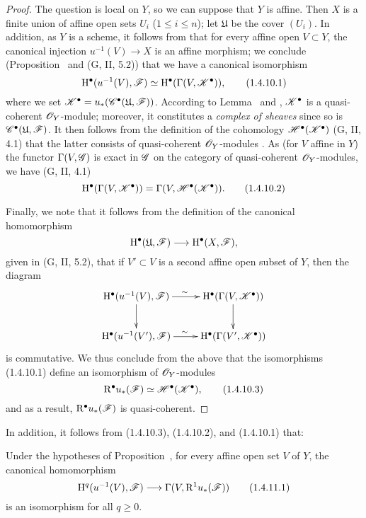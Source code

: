 \begin{proof}
\label{proof-III.1.4.10}
The question is local on $Y$, so we can suppose that $Y$ is affine.
Then $X$ is a finite union of affine open sets $U_i$ ($1\leq i\leq n$); let $\mathfrak{U}$ be the cover $(U_i)$.
In addition, as $Y$ is a scheme, it follows from  that for every affine open $V\subset Y$, the canonical injection $u^{-1}(V)\to X$ is an affine morphism; we conclude (Proposition~ and (G, II, 5.2)) that we have a canonical isomorphism
\[
  \mathrm{H}^\bullet(u^{-1}(V),\mathscr{F})\simeq\mathrm{H}^\bullet(\Gamma(V,\mathscr{K}^\bullet)),
  \tag{1.4.10.1}
\]
where we set $\mathscr{K}^\bullet=u_*(\mathscr{C}^\bullet(\mathfrak{U},\mathscr{F}))$.
According to Lemma~ and , $\mathscr{K}^\bullet$ is a quasi-coherent $\mathscr{O}_Y$-module; moreover, it constitutes a \emph{complex of sheaves} since so is $\mathscr{C}^\bullet(\mathfrak{U},\mathscr{F})$.
It then follows from the definition of the cohomology $\mathscr{H}^\bullet(\mathscr{K}^\bullet)$ (G, II, 4.1) that the latter consists of quasi-coherent $\mathscr{O}_Y$-modules .
As (for $V$ affine in $Y$) the functor $\Gamma(V,\mathscr{G})$ is exact in $\mathscr{G}$ on the category of quasi-coherent $\mathscr{O}_Y$-modules, we have (G, II, 4.1)
\[
  \mathrm{H}^\bullet(\Gamma(V,\mathscr{K}^\bullet))=\Gamma(V,\mathscr{H}^\bullet(\mathscr{K}^\bullet)).
  \tag{1.4.10.2}
\]

Finally, we note that it follows from the definition of the canonical homomorphism
\[
  \HH^\bullet(\mathfrak{U},\sh{F})\to\HH^\bullet(X,\sh{F}),
\]
given in (G, II, 5.2), that if $V'\subset V$ is a second affine open subset of $Y$, then the
diagram
\[
  \xymatrix{
    \HH^\bullet(u^{-1}(V),\sh{F})\ar[r]^\sim\ar[d] &
    \HH^\bullet(\Gamma(V,\sh{K}^\bullet))\ar[d]\\
    \HH^\bullet(u^{-1}(V'),\sh{F})\ar[r]^\sim &
    \HH^\bullet(\Gamma(V',\sh{K}^\bullet))
  }
\]
is commutative.
We thus conclude from the above that the isomorphisms (1.4.10.1) define an isomorphism of $\mathscr{O}_Y$-modules
\[
  \mathrm{R}^\bullet u_*(\mathscr{F})\simeq\mathscr{H}^\bullet(\mathscr{K}^\bullet),
  \tag{1.4.10.3}
\]
and as a result, $\mathrm{R}^\bullet u_*(\mathscr{F})$ is quasi-coherent.
\end{proof}

In addition, it follows from (1.4.10.3), (1.4.10.2), and (1.4.10.1) that:
\begin{corollary}[1.4.11]
\label{III.1.4.11}
Under the hypotheses of Proposition~, for every affine open set $V$ of $Y$, the canonical homomorphism
\[
  \HH^q(u^{-1}(V),\sh{F})\to\Gamma(V,\RR^1 u_*(\sh{F}))
  \tag{1.4.11.1}
\]
is an isomorphism for all $q\geq 0$.
\end{corollary}

